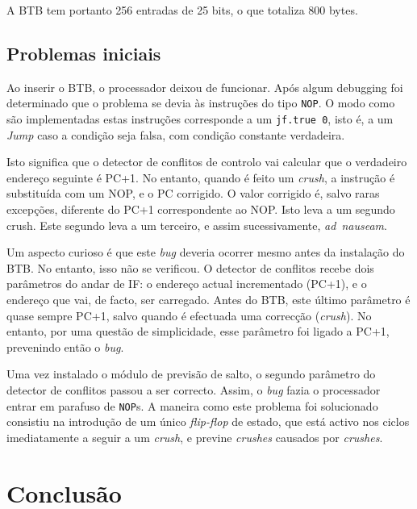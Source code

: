 \documentclass[a4paper]{article}
\begin{document}
	A BTB tem portanto 256 entradas de 25 bits, o que totaliza 800 bytes.
	
	\subsection{Problemas iniciais}
	
	Ao inserir o BTB, o processador deixou de funcionar. Após algum debugging foi determinado que o problema se devia às instruções do tipo \texttt{NOP}. O modo como são implementadas estas instruções corresponde a um \texttt{jf.true 0}, isto é, a um \textit{Jump} caso a condição seja falsa, com condição constante verdadeira.
	
	Isto significa que o detector de conflitos de controlo vai calcular que o verdadeiro endereço seguinte é PC+1. No entanto, quando é feito um \textit{crush}, a instrução é substituída com um NOP, e o PC corrigido. O valor corrigido é, salvo raras excepções, diferente do PC+1 correspondente ao NOP. Isto leva a um segundo crush. Este segundo leva a um terceiro, e assim sucessivamente, \textit{ad~nauseam}.
	
	Um aspecto curioso é que este \textit{bug} deveria ocorrer mesmo antes da instalação do BTB. No entanto, isso não se verificou. O detector de conflitos recebe dois parâmetros do andar de IF: o endereço actual incrementado (PC+1), e o endereço que vai, de facto, ser carregado. Antes do BTB, este último parâmetro é quase sempre PC+1, salvo quando é efectuada uma correcção (\textit{crush}). No entanto, por uma questão de simplicidade, esse parâmetro foi ligado a PC+1, prevenindo então o \textit{bug}.
	
	Uma vez instalado o módulo de previsão de salto, o segundo parâmetro do detector de conflitos passou a ser correcto. Assim, o \textit{bug} fazia o processador entrar em parafuso de \texttt{NOP}s. A maneira como este problema foi solucionado consistiu na introdução de um único \textit{flip-flop} de estado, que está activo nos ciclos imediatamente a seguir a um \textit{crush}, e previne \textit{crushes} causados por \textit{crushes}.
		
		
	\section{Conclusão}
	
\end{document}
